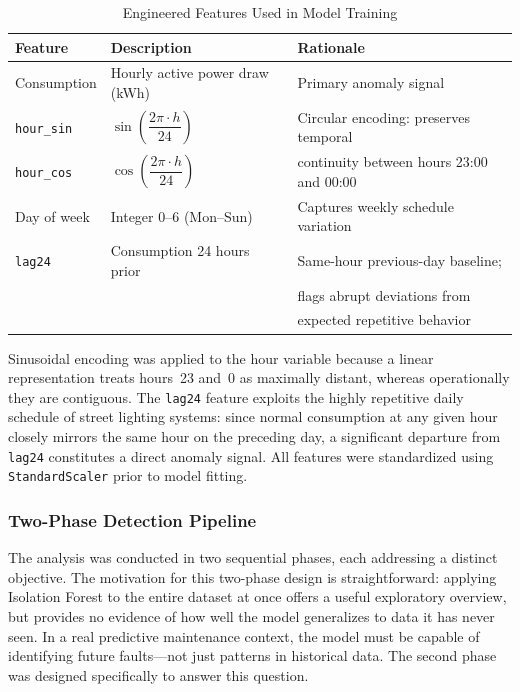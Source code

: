 \documentclass{article}
\begin{document}
\begin{table}[h]
\centering
\caption{Engineered Features Used in Model Training}
\label{tab:features}
\begin{tabular}{p{3.2cm}p{4.5cm}p{5.5cm}}
\hline
\textbf{Feature} & \textbf{Description} & \textbf{Rationale} \\
\hline
Consumption        & Hourly active power draw (kWh) & Primary anomaly signal \\
\texttt{hour\_sin} & $\sin\!\left(\dfrac{2\pi \cdot h}{24}\right)$ &
  Circular encoding: preserves temporal \\
\texttt{hour\_cos} & $\cos\!\left(\dfrac{2\pi \cdot h}{24}\right)$ &
  continuity between hours 23:00 and 00:00 \\
Day of week        & Integer 0--6 (Mon--Sun) & Captures weekly schedule variation \\
\texttt{lag24}     & Consumption 24 hours prior & Same-hour previous-day baseline; \\
                   &                            & flags abrupt deviations from \\
                   &                            & expected repetitive behavior \\
\hline
\end{tabular}
\end{table}

Sinusoidal encoding was applied to the hour variable because a linear representation treats hours~23 and~0 as maximally distant, whereas operationally they are contiguous. The \texttt{lag24} feature exploits the highly repetitive daily schedule of street lighting systems: since normal consumption at any given hour closely mirrors the same hour on the preceding day, a significant departure from \texttt{lag24} constitutes a direct anomaly signal. All features were standardized using \texttt{StandardScaler} prior to model fitting.

\subsubsection{Two-Phase Detection Pipeline}

The analysis was conducted in two sequential phases, each addressing a distinct objective. The motivation for this two-phase design is straightforward: applying Isolation Forest to the entire dataset at once offers a useful exploratory overview, but provides no evidence of how well the model generalizes to data it has never seen. In a real predictive maintenance context, the model must be capable of identifying future faults---not just patterns in historical data. The second phase was designed specifically to answer this question.
\end{document}
